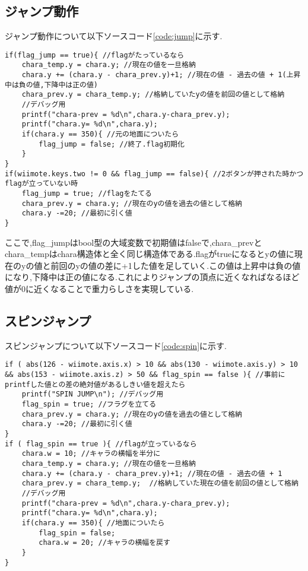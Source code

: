 \documentclass{jarticle}
\begin{document}
\subsection{ジャンプ動作}
ジャンプ動作について以下ソースコード\ref{code:jump}に示す.

\begin{lstlisting}[caption = ジャンプ動作,label=code:jump]
if(flag_jump == true){ //flagがたっているなら
	chara_temp.y = chara.y; //現在の値を一旦格納
	chara.y += (chara.y - chara_prev.y)+1; //現在の値 - 過去の値 + 1(上昇中は負の値,下降中は正の値)
	chara_prev.y = chara_temp.y; //格納していたyの値を前回の値として格納
	//デバッグ用
	printf("chara-prev = %d\n",chara.y-chara_prev.y);
	printf("chara.y= %d\n",chara.y);
	if(chara.y == 350){ //元の地面についたら
		flag_jump = false; //終了.flag初期化
	}
}
if(wiimote.keys.two != 0 && flag_jump == false){ //2ボタンが押された時かつflagが立っていない時
	flag_jump = true; //flagをたてる
	chara_prev.y = chara.y; //現在のyの値を過去の値として格納
	chara.y -=20; //最初に引く値
}
\end{lstlisting}

ここで,flag\_jumpはbool型の大域変数で初期値はfalseで,chara\_prevとchara\_tempはchara構造体と全く同じ構造体である.flagがtrueになるとyの値に現在のyの値と前回のyの値の差に+1した値を足していく.この値は上昇中は負の値になり,下降中は正の値になる.これによりジャンプの頂点に近くなればなるほど値が0に近くなることで重力らしさを実現している.

\subsection{スピンジャンプ}
スピンジャンプについて以下ソースコード\ref{code:spin}に示す.
\begin{lstlisting}[caption = スピンジャンプ,label=code:spin]
if ( abs(126 - wiimote.axis.x) > 10 && abs(130 - wiimote.axis.y) > 10 && abs(153 - wiimote.axis.z) > 50 && flag_spin == false ){ //事前にprintfした値との差の絶対値があるしきい値を超えたら
	printf("SPIN JUMP\n"); //デバッグ用
	flag_spin = true; //フラグを立てる
	chara_prev.y = chara.y; //現在のyの値を過去の値として格納
	chara.y -=20; //最初に引く値
}
if ( flag_spin == true ){ //flagが立っているなら
	chara.w = 10; //キャラの横幅を半分に
	chara_temp.y = chara.y; //現在の値を一旦格納
	chara.y += (chara.y - chara_prev.y)+1; //現在の値 - 過去の値 + 1
	chara_prev.y = chara_temp.y;  //格納していた現在の値を前回の値として格納
	//デバッグ用
	printf("chara-prev = %d\n",chara.y-chara_prev.y);
	printf("chara.y= %d\n",chara.y);
	if(chara.y == 350){ //地面についたら
		flag_spin = false;
		chara.w = 20; //キャラの横幅を戻す
	}
}
\end{lstlisting}
\end{document}
